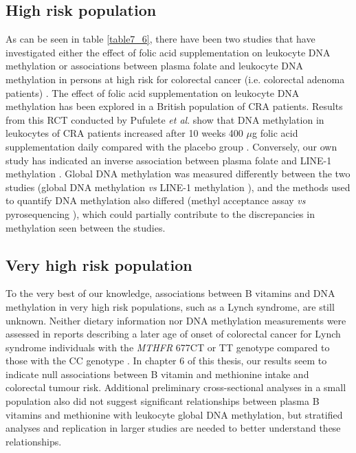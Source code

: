 \subsection{High risk population} %
\noindent As can be seen in table \ref{table7_6}, there have been two studies that have investigated either the effect of folic acid supplementation on leukocyte DNA methylation \cite{c713} or associations between plasma folate and leukocyte DNA methylation in persons at high risk for colorectal cancer (i.e. colorectal adenoma patients) \cite{c714}. The effect of folic acid supplementation on leukocyte DNA methylation has been explored in a British population of CRA patients. Results from this RCT conducted by Pufulete \emph{et al}. show that DNA methylation in leukocytes of CRA patients increased after 10 weeks 400 $\mu$g folic acid supplementation daily compared with the placebo group \cite{c713}. Conversely, our own study has indicated an inverse association between plasma folate and LINE-1 methylation \cite{c714}. Global DNA methylation was measured differently between the two studies (global DNA methylation \cite{c713} \emph{vs} LINE-1 methylation \cite{c714}), and the methods used to quantify DNA methylation also differed (methyl acceptance assay \cite{c713} \emph{vs} pyrosequencing \cite{c714}), which could partially contribute to the discrepancies in methylation seen between the studies.

\subsection{Very high risk population} %
\noindent To the very best of our knowledge, associations between B vitamins and DNA methylation in very high risk populations, such as a Lynch syndrome, are still unknown. Neither dietary information nor DNA methylation measurements were assessed in reports describing a later age of onset of colorectal cancer for Lynch syndrome individuals with the \emph{MTHFR} 677CT or TT genotype compared to those with the CC genotype \cite{c715,c716}. In chapter 6 of this thesis, our results seem to indicate null associations between B vitamin and methionine intake and colorectal tumour risk. Additional preliminary cross-sectional analyses in a small population also did not suggest significant relationships between plasma B vitamins and methionine with leukocyte global DNA methylation, but stratified analyses and replication in larger studies are needed to better understand these relationships.

